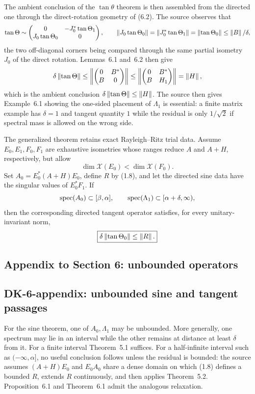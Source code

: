 The ambient conclusion of the $\tan\theta$ theorem is then assembled from the directed one through the direct-rotation geometry of (6.2).  The source observes that
\[
 \tan\Theta\sim
 \begin{pmatrix}
 0&-J_0^*\tan\Theta_1\\
 J_0\tan\Theta_0&0
 \end{pmatrix},
 \qquad
 \left\lVert J_0\tan\Theta_0\right\rVert
 =\left\lVert J_0^*\tan\Theta_1\right\rVert
 =\left\lVert \tan\Theta_0\right\rVert
 \le\left\lVert B\right\rVert/\delta,
\]
the two off-diagonal corners being compared through the same partial isometry $J_0$ of the direct rotation.  Lemmas~6.1 and~6.2 then give
\[
 \delta\left\lVert \tan\Theta\right\rVert
 \le\left\lVert \begin{pmatrix}0&B^*\\B&0\end{pmatrix}\right\rVert
 \le\left\lVert \begin{pmatrix}0&B^*\\B&H_1\end{pmatrix}\right\rVert
 =\left\lVert H\right\rVert,
\]
which is the ambient conclusion $\delta\left\lVert \tan\Theta\right\rVert\le\left\lVert H\right\rVert$.  The source then gives Example~6.1 showing the one-sided placement of $\Lambda_1$ is essential: a finite matrix example has $\delta=1$ and tangent quantity $1$ while the residual is only $1/\sqrt2$ if spectral mass is allowed on the wrong side.

The generalized theorem retains exact Rayleigh--Ritz trial data.  Assume $E_0,E_1,F_0,F_1$ are exhaustive isometries whose ranges reduce $A$ and $A+H$, respectively, but allow
\[
 \dim\mathcal X(E_0)<\dim\mathcal X(F_0).
\]
Set $A_0=E_0^*(A+H)E_0$, define $R$ by (1.8), and let the directed sine data have the singular values of $E_0^*F_1$.  If
\[
 \operatorname{spec}(A_0)\subset[\beta,\alpha],
 \qquad
 \operatorname{spec}(\Lambda_1)\subset[\alpha+\delta,\infty),
\]
then the corresponding directed tangent operator satisfies, for every unitary-invariant norm,
\[
 \boxed{\delta\left\lVert \tan\Theta_0\right\rVert\le\left\lVert R\right\rVert.}
\]

\subsection*{Appendix to Section 6: unbounded operators}

\subsection*{DK-6-appendix: unbounded sine and tangent passages}
For the sine theorem, one of $A_0,\Lambda_1$ may be unbounded.  More generally, one spectrum may lie in an interval while the other remains at distance at least $\delta$ from it.  For a finite interval Theorem~5.1 suffices.  For a half-infinite interval such as $(-\infty,\alpha]$, no useful conclusion follows unless the residual is bounded: the source assumes $(A+H)E_0$ and $E_0A_0$ share a dense domain on which (1.8) defines a bounded $R$, extends $R$ continuously, and then applies Theorem~5.2.  Proposition~6.1 and Theorem~6.1 admit the analogous relaxation.

